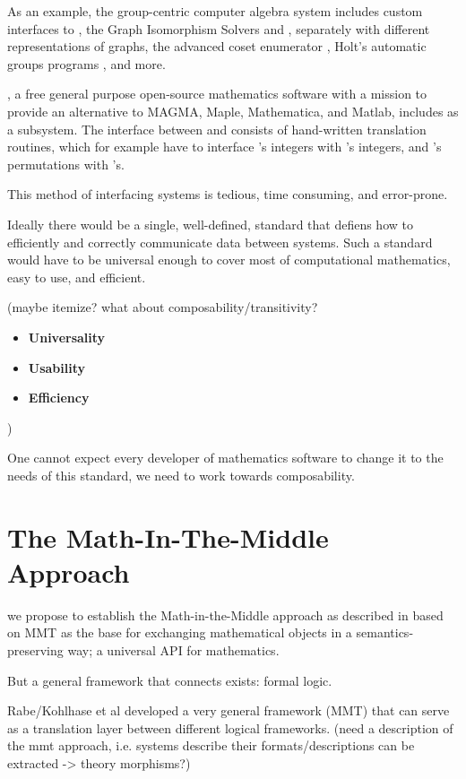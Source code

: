 As an example, the group-centric computer algebra system \GAP includes custom
interfaces to \Singular, the Graph Isomorphism Solvers \Nauty and \Bliss,
separately with different representations of graphs, the advanced coset
enumerator \ACE, Holt's automatic groups programs \KBMAG, and more.

\Sage, a free general purpose open-source mathematics software with a mission to
provide an alternative to MAGMA, Maple, Mathematica, and Matlab, includes \GAP
as a subsystem. The interface between \Sage and \GAP consists of hand-written
translation routines, which for example have to interface \Sage's integers with
\GAP's integers, and \Sage's permutations with \GAP's.

This method of interfacing systems is tedious, time consuming, and error-prone.

Ideally there would be a single, well-defined, standard that defiens how to
efficiently and correctly communicate data between systems.
Such a standard would have to be universal enough to cover most of
computational mathematics, easy to use, and efficient.

(maybe itemize? what about composability/transitivity?
\begin{itemize}
\item \textbf{Universality}
\item \textbf{Usability}
\item \textbf{Efficiency}
\end{itemize}
)

One cannot expect every developer of mathematics software to change it to
the needs of this standard, we need to work towards
composability.

\section{The Math-In-The-Middle Approach}

we propose to establish the Math-in-the-Middle approach as described in
 based on MMT as the base for exchanging mathematical
objects in a semantics-preserving way; a universal API for mathematics.

But a general framework that connects exists: formal logic.

Rabe/Kohlhase et al developed a very general framework (MMT) that can serve as a
translation layer between different logical frameworks.
(need a description of the mmt approach, i.e. systems describe their
formats/descriptions can be extracted -> theory morphisms?)

